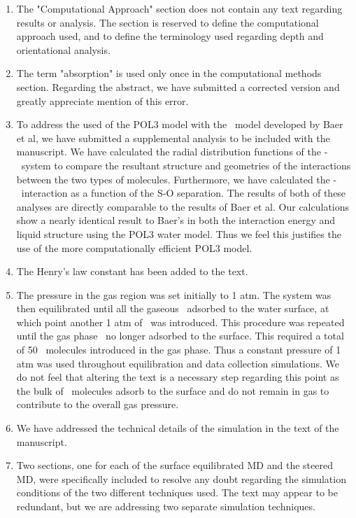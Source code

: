 \documentclass{article}
\begin{document}
\begin{enumerate}
\item The "Computational Approach" section does not contain any text regarding results or analysis. The section is reserved to define the computational approach used, and to define the terminology used regarding depth and orientational analysis.

\item The term "absorption" is used only once in the computational methods section. Regarding the abstract, we have submitted a corrected version and greatly appreciate mention of this error.

\item To address the used of the POL3 model with the \suldiox~model developed by Baer et al, we have submitted a supplemental analysis to be included with the manuscript. We have calculated the radial distribution functions of the \wat-\suldiox~system to compare the resultant structure and geometries of the interactions between the two types of molecules. Furthermore, we have calculated the \suldiox-\wat~interaction as a function of the S-O separation. The results of both of these analyses are directly comparable to the results of Baer et al. Our calculations show a nearly identical result to Baer's in both the interaction energy and liquid structure using the POL3 water model. Thus we feel this justifies the use of the more computationally efficient POL3 model.

\item The Henry's law constant has been added to the text.

\item The pressure in the gas region was set initially to 1 atm. The system was then equilibrated until all the gaseous \suldiox~adsorbed to the water surface, at which point another 1 atm of \suldiox~was introduced. This procedure was repeated until the gas phase \suldiox~no longer adsorbed to the surface. This required a total of 50 \suldiox~molecules introduced in the gas phase. Thus a constant pressure of 1 atm was used throughout equilibration and data collection simulations. We do not feel that altering the text is a necessary step regarding this point as the bulk of \suldiox~molecules adsorb to the surface and do not remain in gas to contribute to the overall gas pressure.

\item We have addressed the technical details of the simulation in the text of the manuscript.

\item Two sections, one for each of the surface equilibrated MD and the steered MD, were specifically included to resolve any doubt regarding the simulation conditions of the two different techniques used. The text may appear to be redundant, but we are addressing two separate simulation techniques.


\end{enumerate}
\end{document}
